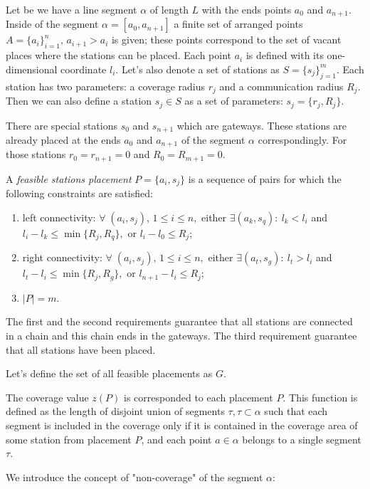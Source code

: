 Let be we have a line segment $\alpha$ of length $L$ with the ends points $a_0$ and $a_{n+1}$. Inside of the segment $\alpha = [a_0, a_{n+1}]$ a finite set of arranged points $A = \{a_i\}_{i=1}^n, \, a_{i+1} > a_i$ is given; these points correspond to the set of vacant places where the stations can be placed. Each point $a_i$ is defined with its one-dimensional coordinate $l_i$. Let's also denote a set of stations as $S = \{s_j\}_{j=1}^m$. Each station has two parameters: a coverage radius $r_j$ and a communication radius $R_j$. Then we can also define a station $s_j\in S$ as a set of parameters: $s_j = \{r_j, R_j\}$.

There are special stations $s_0$ and $s_{n+1}$ which are gateways. These stations are already placed at the ends $a_0$ and $a_{n+1}$ of the segment 
$\alpha$ correspondingly. For those stations  $r_0 = r_{n+1} = 0$ and $R_0 = R_{m+1} = 0$. 

A \textit{feasible stations placement} $P = \{a_i, s_j\}$ is a sequence of pairs for which the following constraints are satisfied:

\begin{enumerate}
	\item left connectivity: $\forall\;(a_i, s_j),\,1 \leq i \leq n,$ either $\exists (a_k, s_q):\:l_k < l_i $ 
	and $l_i - l_k \leq \min \{R_j, R_q \},$ or $l_i - l_0 \leq R_j$;
	\item right connectivity: $\forall\;(a_i, s_j),\,1 \leq i \leq n,$ either $\exists (a_t, s_g):\:l_t > l_i $ 
	and $ l_t - l_i \leq \min \{R_j, R_g \}, $ or $ l_{n+1} - l_i \leq R_j$;	
	\item $|P| = m$.
\end{enumerate}

The first and the second requirements guarantee that all stations are connected in a chain and this chain ends in the gateways. The third requirement guarantee that all stations have been placed. 

Let’s define the set of all feasible placements as $G$. 

The coverage value $z(P)$ is corresponded to each placement $P$.  This function is defined as the length of disjoint union 
of segments $\tau,\tau \subset \alpha$ such that each segment is included in the coverage only if it is contained in the coverage 
area of some station from placement $P$, and each point $a \in \alpha$ belongs to a single segment $\tau$.

We introduce the concept of "non-coverage" of the segment $\alpha$:

